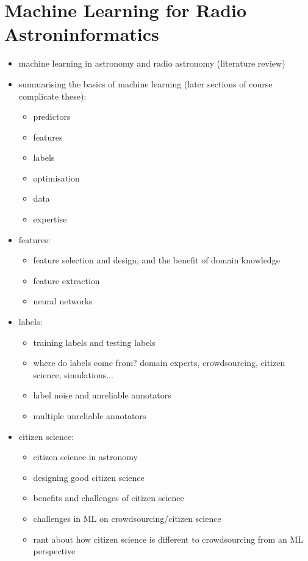 \section{Machine Learning for Radio Astroninformatics}
\label{sec:radio-astroinformatics}
    \begin{itemize}
        \item machine learning in astronomy and radio astronomy (literature review)
        \item summarising the basics of machine learning (later sections of course complicate these): \begin{itemize}
            \item predictors
            \item features
            \item labels
            \item optimisation
            \item data
            \item expertise
        \end{itemize}
        \item features: \begin{itemize}
            \item feature selection and design, and the benefit of domain knowledge
            \item feature extraction
            \item neural networks
        \end{itemize}
        \item labels: \begin{itemize}
            \item training labels and testing labels
            \item where do labels come from? domain experts, crowdsourcing, citizen science, simulations...
            \item label noise and unreliable annotators
            \item multiple unreliable annotators
        \end{itemize}
        \item citizen science: \begin{itemize}
            \item citizen science in astronomy
            \item designing good citizen science
            \item benefits and challenges of citizen science
            \item challenges in ML on crowdsourcing/citizen science
            \item rant about how citizen science is different to crowdsourcing from an ML perspective
        \end{itemize}
    \end{itemize}

